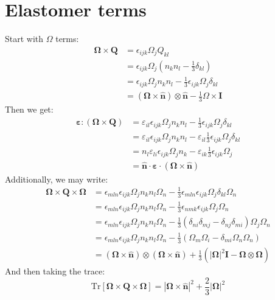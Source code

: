 \documentclass[reqno]{article}
\newcommand{\Q}{\mathbf{Q}}
\newcommand{\bI}{\mathbf{I}}
\newcommand{\bOmega}{\boldsymbol{\Omega}}
\newcommand{\n}{\mathbf{\hat{n}}}
\newcommand{\beps}{\boldsymbol{\varepsilon}}
\begin{document}
\section{Elastomer terms}

Start with $\Omega$ terms:
\begin{equation}
\begin{split}
    \bOmega \times \Q
    &=
    \epsilon_{ijk} \Omega_j Q_{kl} \\
    &=
    \epsilon_{ijk} \Omega_j \left( n_k n_l - \frac13 \delta_{kl} \right) \\
    &=
    \epsilon_{ijk} \Omega_j n_k n_l
    - \frac13 \epsilon_{ijk} \Omega_j \delta_{kl} \\
    &=
    \left( \bOmega \times \n \right) \otimes \n
    - \frac13 \Omega \times \bI
\end{split}
\end{equation}
Then we get:
\begin{equation}
\begin{split}
    \beps : \left( \bOmega \times \Q \right)
    &=
    \varepsilon_{il} \epsilon_{ijk} \Omega_j n_k n_l
    - \frac13 \epsilon_{ijk} \Omega_j \delta_{kl} \\
    &=
    \varepsilon_{il} \epsilon_{ijk} \Omega_j n_k n_l
    - \varepsilon_{il} \frac13 \epsilon_{ijk} \Omega_j \delta_{kl} \\
    &=
    n_l \varepsilon_{li} \epsilon_{ijk} \Omega_j n_k 
    - \varepsilon_{ik} \frac13 \epsilon_{ijk} \Omega_j \\
    &=
    \n \cdot \beps \cdot \left( \bOmega \times \n \right) 
\end{split}
\end{equation}
Additionally, we may write:
\begin{equation}
\begin{split}
    \bOmega \times \Q \times \bOmega
    &=
    \epsilon_{mln} \epsilon_{ijk} \Omega_j n_k n_l \Omega_{n}
    - \frac13 \epsilon_{mln} \epsilon_{ijk} \Omega_j \delta_{kl} \Omega_{n} \\
    &=
    \epsilon_{mln} \epsilon_{ijk} \Omega_j n_k n_l \Omega_{n}
    - \frac13 \epsilon_{nmk} \epsilon_{ijk} \Omega_j \Omega_{n} \\
    &=
    \epsilon_{mln} \epsilon_{ijk} \Omega_j n_k n_l \Omega_{n}
    - \frac13 \left( \delta_{ni} \delta_{mj} - \delta_{nj} \delta_{mi} \right) \Omega_j \Omega_{n} \\
    &=
    \epsilon_{mln} \epsilon_{ijk} \Omega_j n_k n_l \Omega_{n}
    - \frac13 \left( \Omega_m \Omega_{i} - \delta_{mi}\Omega_n \Omega_{n} \right) \\
    &= 
    \left( \bOmega \times \n \right) \otimes \left( \bOmega \times \n \right)
    + \frac13 \left( \left| \bOmega \right|^2 \bI - \bOmega \otimes \bOmega \right)
\end{split}
\end{equation}
And then taking the trace:
\begin{equation}
    \text{Tr} \left[ \bOmega \times \Q \times \bOmega \right]
    =
    \left| \bOmega \times \n \right|^2
    +
    \frac23 \left| \bOmega \right|^2
\end{equation}
\end{document}
